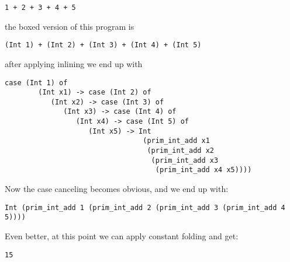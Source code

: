 \documentclass{article}
\begin{document}
\begin{verbatim}
1 + 2 + 3 + 4 + 5
\end{verbatim}
the boxed version of this program is
\begin{verbatim}
(Int 1) + (Int 2) + (Int 3) + (Int 4) + (Int 5)
\end{verbatim}
after applying inlining we end up with
\begin{verbatim}
case (Int 1) of
        (Int x1) -> case (Int 2) of
           (Int x2) -> case (Int 3) of
              (Int x3) -> case (Int 4) of
                 (Int x4) -> case (Int 5) of
                    (Int x5) -> Int 
                                 (prim_int_add x1 
                                  (prim_int_add x2
                                   (prim_int_add x3
                                    (prim_int_add x4 x5))))
\end{verbatim}

Now the case canceling becomes obvious,
and we end up with:
\begin{verbatim}
Int (prim_int_add 1 (prim_int_add 2 (prim_int_add 3 (prim_int_add 4 5))))
\end{verbatim}

Even better, at this point we can apply constant folding and get:
\begin{verbatim}
15
\end{verbatim}
\end{document}

